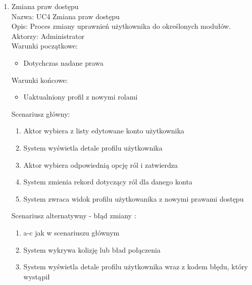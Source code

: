 \begin{enumerate}
\item Zmiana praw dostępu \\
Nazwa: UC4 Zmiana praw dostępu \\
Opis: Proces zmiany uprawnień użytkownika do określonych modułów. \\
Aktorzy: Administrator \\
Warunki początkowe:
\begin{itemize}
\item Dotychczas nadane prawa 
\end{itemize}
Warunki końcowe: 
\begin{itemize}
\item Uaktualniony profil z nowymi rolami
\end{itemize}
Scenariusz główny: 
\begin{enumerate}
\item Aktor wybiera z listy edytowane konto użytkownika
\item System wyświetla detale profilu użytkownika
\item Aktor wybiera odpowiednią opcję ról i zatwierdza
\item System zmienia rekord dotyczący ról dla danego konta
\item System zwraca widok profilu użytkowanika z nowymi prawami dostępu
\end{enumerate}
Scenariusz alternatywny - błąd zmiany : 
\begin{enumerate}
\item a-c jak w scenariuszu głównym
\item System wykrywa kolizję lub bład połączenia
\item System wyświetla detale profilu użytkownika wraz z kodem błędu, który wystąpił
\end{enumerate}


\end{enumerate}
